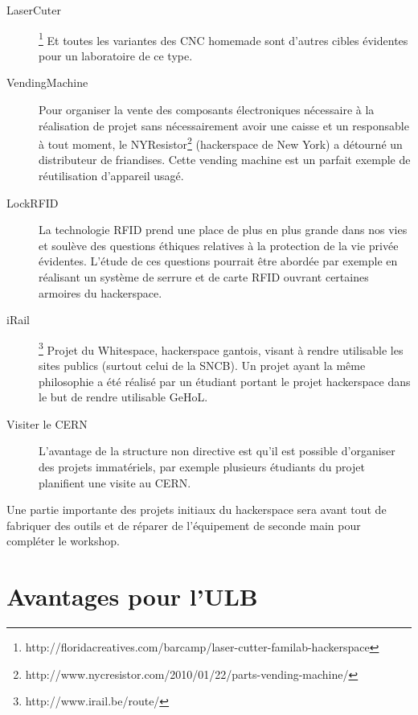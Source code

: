 \documentclass{article}
\begin{document}
\begin{description}
\item[LaserCuter]\footnote{http://floridacreatives.com/barcamp/laser-cutter-familab-hackerspace} Et toutes les variantes des CNC homemade sont d'autres cibles évidentes pour un laboratoire de ce type.
\item[VendingMachine] Pour organiser la vente des composants électroniques nécessaire à la réalisation de projet sans nécessairement avoir une caisse et un responsable à tout moment, le NYResistor\footnote{http://www.nycresistor.com/2010/01/22/parts-vending-machine/} (hackerspace de New York) a détourné un distributeur de friandises. Cette vending machine est un parfait exemple de réutilisation d'appareil usagé.
\item[LockRFID] La technologie RFID prend une place de plus en plus grande dans nos vies et soulève des questions éthiques relatives à la protection de la vie privée évidentes. L'étude de ces questions pourrait être abordée par exemple en réalisant un système de serrure et de carte RFID ouvrant certaines armoires du hackerspace.
\item[iRail]\footnote{http://www.irail.be/route/} Projet du Whitespace, hackerspace gantois, visant à rendre utilisable les sites publics (surtout celui de la SNCB). Un projet ayant la même philosophie a été réalisé par un étudiant portant le projet hackerspace dans le but de rendre utilisable GeHoL.
\item[Visiter le CERN] L'avantage de la structure non directive est qu'il est possible d'organiser des projets immatériels, par exemple plusieurs étudiants du projet planifient une visite au CERN.
\end{description}

Une partie importante des projets initiaux du hackerspace sera avant tout de fabriquer des outils et de réparer de l'équipement de seconde main pour compléter le workshop.

\section{Avantages pour l'ULB}
\end{document}
